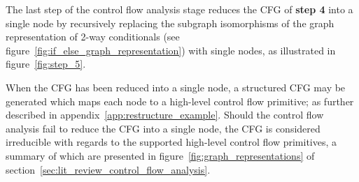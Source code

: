 The last step of the control flow analysis stage reduces the CFG of \textbf{step 4} into a single node by recursively replacing the subgraph isomorphisms of the graph representation of 2-way conditionals (see figure~\ref{fig:if_else_graph_representation}) with single nodes, as illustrated in figure~\ref{fig:step_5}.

When the CFG has been reduced into a single node, a structured CFG may be generated which maps each node to a high-level control flow primitive; as further described in appendix~\ref{app:restructure_example}. Should the control flow analysis fail to reduce the CFG into a single node, the CFG is considered irreducible with regards to the supported high-level control flow primitives, a summary of which are presented in figure~\ref{fig:graph_representations} of section~\ref{sec:lit_review_control_flow_analysis}.

